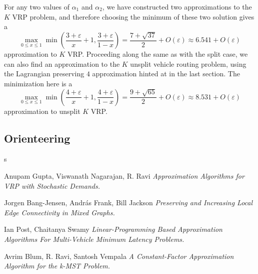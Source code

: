 \documentclass{article}
\theoremstyle{plain}
\begin{document}
For any two values of $\alpha_1$ and $\alpha_2$, we have constructed two approximations to the $K$ VRP problem, and therefore choosing the minimum of these two solution gives a
%
\[ \max_{0 \leq x \leq 1} \min \left( \frac{3 + \varepsilon}{x} + 1, \frac{3 + \varepsilon}{1 - x} \right) = \frac{7 + \sqrt{37}}{2} + O(\varepsilon) \approx 6.541 + O(\varepsilon) \]
%
approximation to $K$ VRP. Proceeding along the same as with the split case, we can also find an approximation to the $K$ unsplit vehicle routing problem, using the Lagrangian preserving $4$ approximation hinted at in the last section. The minimization here is a
%
\[ \max_{0 \leq x \leq 1} \min \left( \frac{4 + \varepsilon}{x} + 1, \frac{4 + \varepsilon}{1 - x} \right) = \frac{9 + \sqrt{65}}{2} + O(\varepsilon) \approx 8.531 + O(\varepsilon) \]
%
approximation to unsplit $K$ VRP.

\subsection{Orienteering}

s

\begin{thebibliography}{9}

Anupam Gupta, Viswanath Nagarajan, R. Ravi
\textit{Approximation Algorithms for VRP with Stochastic Demands.}

Jorgen Bang-Jensen, Andr\'{a}s Frank, Bill Jackson
\textit{Preserving and Increasing Local Edge Connectivity in Mixed Graphs.}

Ian Post, Chaitanya Swamy
\textit{Linear-Programming Based Approximation Algorithms For Multi-Vehicle Minimum Latency Problems.}

Avrim Blum, R. Ravi, Santosh Vempala
\textit{A Constant-Factor Approximation Algorithm for the k-MST Problem.}

\end{thebibliography}
\end{document}
